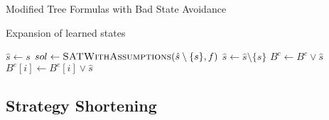 \begin{algorithm}
    \caption{Modified Tree Formulas with Bad State Avoidance}
    \label{alg:treeFormulaLearning}
    \begin{algorithmic}[1]
        \State {}
        \Else
        \State {}
        \EndIf
        \EndFunction
    \end{algorithmic}

    \begin{algorithmic}[1]
        \State {}
        \Else
        \State {}
        \EndIf
        \EndFunction
    \end{algorithmic}
\end{algorithm}

\begin{algorithm}
    \caption{Expansion of learned states}
    \label{alg:boundedLearning}
    \begin{algorithmic}
            \State $ \hat{s} \gets s$
            \State $sol \gets \Call{SATWithAssumptions}{\hat{s} \setminus \{ s \}, f}$
                    \State $\hat{s} \gets \hat{s} \setminus \{ s \}$
                \EndIf
            \EndFor
                \State $B^c \gets B^c \lor \hat{s}$
            \Else
                    \State $B^e[i] \gets B^e[i] \lor \hat{s}$
                \EndFor
            \EndIf
        \EndFunction
    \end{algorithmic}
\end{algorithm}

\subsection{Strategy Shortening}

